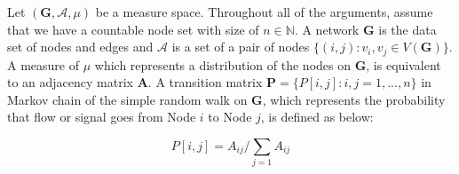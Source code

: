 \documentclass[12pt]{article}
\theoremstyle{definition}
\begin{document}
Let $(\boldsymbol{G}, \mathcal{A}, \mu)$ be a measure space. Throughout all of the arguments, assume that we have a countable node set with size of $n \in \mathbb{N}$. A network $\boldsymbol{G}$ is the data set of nodes and edges and $\mathcal{A}$ is a set of a pair of nodes $\{(i,j) : v_{i}, v_{j} \in V(\boldsymbol{G}) \}$. A measure of $\mu$ which represents a distribution of the nodes on $\boldsymbol{G}$, is equivalent to an adjacency matrix $\boldsymbol{A}$. A transition matrix $\mathbf{P} = \{P[i,j] : i,j=1,...,n \}$ in Markov chain of the simple random walk on $\boldsymbol{G}$, which represents the probability that flow or signal goes from Node $i$ to Node $j$, is defined as below:
	
\begin{equation}
P[i,j] = A_{ij} \big/ \sum\limits_{j=1} A_{ij}
\end{equation}
	
\end{document}
